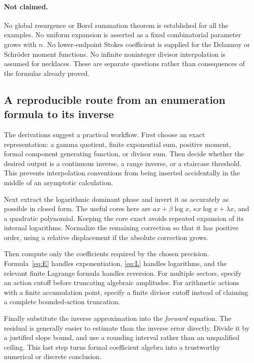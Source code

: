 \documentclass[11pt,a4paper]{article}
\numberwithin{equation}{section}
\theoremstyle{definition}
\theoremstyle{remark}
\begin{document}
\paragraph{Not claimed.}
No global resurgence or Borel summation theorem is established for all the examples. No uniform expansion is asserted as a fixed combinatorial parameter grows with $n$. No lower-endpoint Stokes coefficient is supplied for the Delannoy or Schr\"oder moment functions. No infinite noninteger divisor interpolation is assumed for necklaces. These are separate questions rather than consequences of the formulas already proved.

\subsection{A reproducible route from an enumeration formula to its inverse}

The derivations suggest a practical workflow. First choose an exact representation: a gamma quotient, finite exponential sum, positive moment, formal component generating function, or divisor sum. Then decide whether the desired output is a continuous inverse, a range inverse, or a staircase threshold. This prevents interpolation conventions from being inserted accidentally in the middle of an asymptotic calculation.

Next extract the logarithmic dominant phase and invert it as accurately as possible in closed form. The useful cores here are $ax+\beta\log x$, $\kappa x\log x+\lambda x$, and a quadratic polynomial. Keeping the core exact avoids repeated expansion of its internal logarithms. Normalize the remaining correction so that it has positive order, using a relative displacement if the absolute correction grows.

Then compute only the coefficients required by the chosen precision. Formula~\eqref{eq:E} handles exponentiation, \eqref{eq:L} handles logarithms, and the relevant finite Lagrange formula handles reversion. For multiple sectors, specify an action cutoff before truncating algebraic amplitudes. For arithmetic actions with a finite accumulation point, specify a finite divisor cutoff instead of claiming a complete bounded-action truncation.

Finally substitute the inverse approximation into the \emph{forward} equation. The residual is generally easier to estimate than the inverse error directly. Divide it by a justified slope bound, and use a rounding interval rather than an unqualified ceiling. This last step turns formal coefficient algebra into a trustworthy numerical or discrete conclusion.
\end{document}
